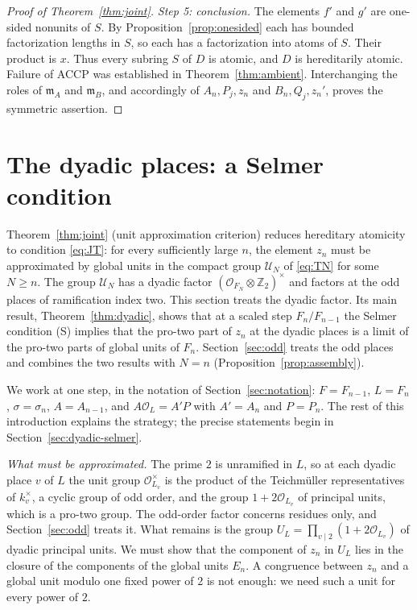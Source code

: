 \documentclass[11pt]{article}
\theoremstyle{plain}
\theoremstyle{definition}
\theoremstyle{remark}
\newcommand{\Z}{\mathbb Z}
\newcommand{\OO}{\mathcal O}
\newcommand{\EA}{\mathfrak m_A}
\newcommand{\EB}{\mathfrak m_B}
\begin{document}
\begin{proof}[Proof of Theorem~\ref{thm:joint}]
\emph{Step 5: conclusion.}  The elements $f'$ and $g'$ are one-sided
nonunits of $S$.  By Proposition~\ref{prop:onesided} each has bounded
factorization lengths in $S$, so each has a factorization into atoms of
$S$.  Their product is $x$.  Thus every subring $S$ of $D$ is atomic, and
$D$ is hereditarily atomic.  Failure of ACCP was established in
Theorem~\ref{thm:ambient}.  Interchanging the roles of $\EA$ and $\EB$,
and accordingly of $A_n,P_j,z_n$ and $B_n,Q_j,z_n'$, proves the symmetric
assertion.
\end{proof}

\section{The dyadic places: a Selmer condition}\label{sec:dyadic}

Theorem~\ref{thm:joint} (unit approximation criterion) reduces hereditary
atomicity to condition \eqref{eq:JT}: for every sufficiently large $n$,
the element $z_n$ must be approximated by global units in the compact
group $\mathcal U_N$ of \eqref{eq:TN} for some $N\ge n$.  The group
$\mathcal U_N$ has a dyadic factor $(\OO_{F_N}\otimes\Z_2)^\times$ and
factors at the odd places of ramification index two.  This section treats
the dyadic factor.  Its main result, Theorem~\ref{thm:dyadic}, shows that
at a scaled step $F_n/F_{n-1}$ the Selmer condition (S) implies that the
pro-two part of $z_n$ at the dyadic places is a limit of the pro-two
parts of global units of $F_n$.  Section~\ref{sec:odd} treats the odd places and combines the two
results with $N=n$ (Proposition~\ref{prop:assembly}).

We work at one step, in the notation of Section~\ref{sec:notation}:
$F=F_{n-1}$, $L=F_n$, $\sigma=\sigma_n$, $A=A_{n-1}$, and
$A\OO_L=A'P$ with $A'=A_n$ and $P=P_n$.  The rest of this introduction
explains the strategy; the precise statements begin in
Section~\ref{sec:dyadic-selmer}.

\emph{What must be approximated.}  The prime $2$ is unramified in $L$, so
at each dyadic place $v$ of $L$ the unit group $\OO_{L_v}^\times$ is the
product of the Teichm\"uller representatives of $k_v^\times$, a cyclic
group of odd order, and the group $1+2\OO_{L_v}$ of principal units,
which is a pro-two group.  The odd-order factor concerns residues only,
and Section~\ref{sec:odd} treats it.  What remains is the group
$U_L=\prod_{v\mid2}(1+2\OO_{L_v})$ of dyadic principal units.  We must
show that the component of $z_n$ in $U_L$ lies in the closure of the
components of the global units $E_n$.  A congruence between $z_n$ and a
global unit modulo one fixed power of $2$ is not enough: we need such a
unit for every power of $2$.
\end{document}
